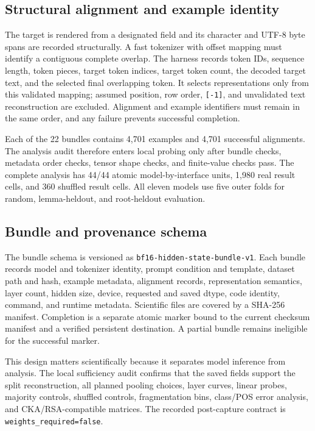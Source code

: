 \documentclass[pdflatex,sn-basic]{sn-jnl}
\begin{document}
\subsection{Structural alignment and example identity}

The target is rendered from a designated field and its character and UTF-8
byte spans are recorded structurally. A fast tokenizer with offset mapping
must identify a contiguous complete overlap. The harness records token IDs,
sequence length, token pieces, target token indices, target token count, the
decoded target text, and the selected final overlapping token. It selects
representations only from this validated mapping; assumed position, row order,
\texttt{[-1]}, and unvalidated text reconstruction are excluded. Alignment and example identifiers must
remain in the same order, and any failure prevents successful completion.

Each of the 22 bundles contains 4,701 examples and 4,701 successful
alignments. The analysis audit therefore enters local probing only after
bundle checks, metadata order checks, tensor shape checks, and finite-value
checks pass. The complete analysis has 44/44 atomic model-by-interface units,
1,980 real result cells, and 360 shuffled result cells. All eleven models use
five outer folds for random, lemma-heldout, and root-heldout evaluation.

\subsection{Bundle and provenance schema}

The bundle schema is versioned as \texttt{bf16-hidden-state-bundle-v1}. Each
bundle records model and tokenizer identity, prompt condition and template,
dataset path and hash, example metadata, alignment records, representation
semantics, layer count, hidden size, device, requested and saved dtype, code
identity, command, and runtime metadata. Scientific files are covered by a
SHA-256 manifest. Completion is a separate atomic marker bound to the current
checksum manifest and a verified persistent destination. A partial bundle
remains ineligible for the successful marker.

This design matters scientifically because it separates model inference from
analysis. The local sufficiency audit confirms that the saved fields support
the split reconstruction, all planned pooling choices, layer curves, linear
probes, majority controls, shuffled controls, fragmentation bins, class/POS
error analysis, and CKA/RSA-compatible matrices.
The recorded post-capture contract is \texttt{weights\_required=false}.
\end{document}
